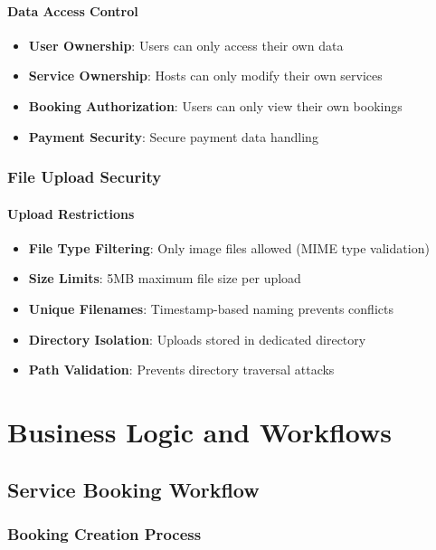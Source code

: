 \documentclass[12pt,a4paper]{article}
\begin{document}
\paragraph{Data Access Control}
\begin{itemize}
\item \textbf{User Ownership}: Users can only access their own data
\item \textbf{Service Ownership}: Hosts can only modify their own services
\item \textbf{Booking Authorization}: Users can only view their own bookings
\item \textbf{Payment Security}: Secure payment data handling
\end{itemize}

\subsubsection{File Upload Security}
\label{subsubsec:file-security}

\paragraph{Upload Restrictions}
\begin{itemize}
\item \textbf{File Type Filtering}: Only image files allowed (MIME type validation)
\item \textbf{Size Limits}: 5MB maximum file size per upload
\item \textbf{Unique Filenames}: Timestamp-based naming prevents conflicts
\item \textbf{Directory Isolation}: Uploads stored in dedicated directory
\item \textbf{Path Validation}: Prevents directory traversal attacks
\end{itemize}

\section{Business Logic and Workflows}
\label{sec:business-logic}

\subsection{Service Booking Workflow}
\label{subsec:booking-workflow}

\subsubsection{Booking Creation Process}
\label{subsubsec:booking-creation}
\end{document}
